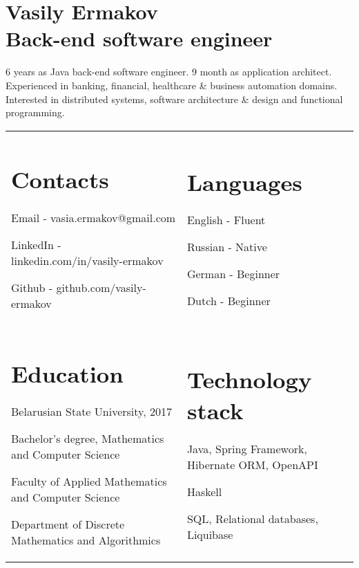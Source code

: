 \documentclass{article}
\begin{document}
    \section*{Vasily Ermakov\\Back-end software engineer}
    6 years as Java back-end software engineer. 9 month as application architect.\\
    Experienced in banking, financial, healthcare \& business automation domains.\\
    Interested in distributed systems, software architecture \& design and functional programming.\\
    \begin{tabular}{p{275pt} p{275pt}}
        \section*{Contacts}
        Email - vasia.ermakov@gmail.com

        LinkedIn - linkedin.com/in/vasily-ermakov

        Github - github.com/vasily-ermakov
        &
        \section*{Languages}
        English - Fluent

        Russian - Native

        German - Beginner

        Dutch - Beginner\\
        \section*{Education}

        Belarusian State University, 2017

        Bachelor's degree, Mathematics and Computer Science

        Faculty of Applied Mathematics and Computer Science

        Department of Discrete Mathematics and Algorithmics
        &
        \section*{Technology stack}
        Java, Spring Framework, Hibernate ORM, OpenAPI

        Haskell

        SQL, Relational databases, Liquibase


\end{tabular}
\end{document}
